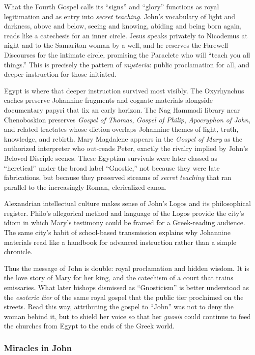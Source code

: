 What the Fourth Gospel calls its “signs” and “glory” functions as royal legitimation and as entry into \emph{secret teaching}.
John’s vocabulary of light and darkness, above and below, seeing and knowing, abiding and being born again, reads like a catechesis for an inner circle.
Jesus speaks privately to Nicodemus at night and to the Samaritan woman by a well, and he reserves the Farewell Discourses for the intimate circle, promising the Paraclete who will “teach you all things.”
This is precisely the pattern of \emph{mysteria}: public proclamation for all, and deeper instruction for those initiated.

Egypt is where that deeper instruction survived most visibly.
The Oxyrhynchus caches preserve Johannine fragments and cognate materials alongside documentary papyri that fix an early horizon.
The Nag Hammadi library near Chenoboskion preserves \emph{Gospel of Thomas}, \emph{Gospel of Philip}, \emph{Apocryphon of John}, and related tractates whose diction overlaps Johannine themes of light, truth, knowledge, and rebirth.
Mary Magdalene appears in the \emph{Gospel of Mary} as the authorized interpreter who out-reads Peter, exactly the rivalry implied by John’s Beloved Disciple scenes.
These Egyptian survivals were later classed as “heretical” under the broad label “Gnostic,” not because they were late fabrications, but because they preserved streams of \emph{secret teaching} that ran parallel to the increasingly Roman, clericalized canon.

Alexandrian intellectual culture makes sense of John’s Logos and its philosophical register.
Philo’s allegorical method and language of the Logos provide the city’s idiom in which Mary’s testimony could be framed for a Greek-reading audience.
The same city’s habit of school-based transmission explains why Johannine materials read like a handbook for advanced instruction rather than a simple chronicle.

Thus the message of John is double: royal proclamation and hidden wisdom.
It is the love story of Mary for her king, and the catechism of a court that trains emissaries.
What later bishops dismissed as “Gnosticism” is better understood as the \emph{esoteric tier} of the same royal gospel that the public tier proclaimed on the streets.
Read this way, attributing the gospel to “John” was not to deny the woman behind it, but to shield her voice so that her \emph{gnosis} could continue to feed the churches from Egypt to the ends of the Greek world.

\subsubsection{Miracles in John}\label{par:miracles-in-john}

